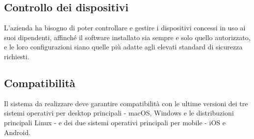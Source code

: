 \subsection{Controllo dei dispositivi}
L'azienda ha bisogno di poter controllare e gestire i dispositivi concessi in uso ai suoi dipendenti, affinché il software installato sia sempre e solo quello autorizzato, e le loro configurazioni siano quelle più adatte agli elevati standard di sicurezza richiesti.

\subsection{Compatibilità}
Il sistema da realizzare deve garantire compatibilità con le ultime versioni dei tre sistemi operativi per desktop principali - macOS, Windows e le distribuzioni principali Linux -  e dei due sistemi operativi principali per mobile - iOS e Android.